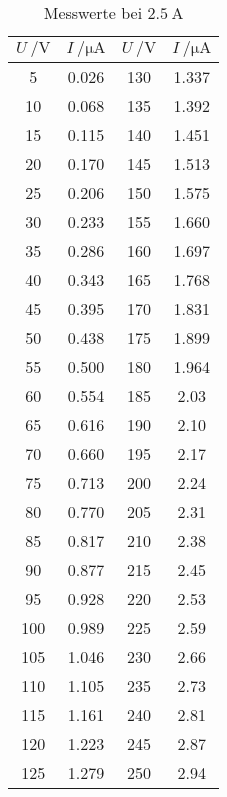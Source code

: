 \begin{table}[H]
  \centering
  \caption{Messwerte bei $ \SI{2.5}{\ampere}$}
  \label{tab:tabe2}
    \begin{tabular}{S S |S S}
    \toprule
    $ U \: / \si{\volt} $ & $ I \: / \si{\micro\ampere} $ & $ U \: / \si{\volt} $ & $ I \: / \si{\micro\ampere} $  \\
     & 0.026 & 130 & 1.337 \\
    10 & 0.068 & 135 & 1.392 \\
    15 & 0.115 & 140 & 1.451 \\
    20 & 0.170 & 145 & 1.513 \\
    25 & 0.206 & 150 & 1.575 \\
    30 & 0.233 & 155 & 1.660 \\
    35 & 0.286 & 160 & 1.697 \\
    40 & 0.343 & 165 & 1.768 \\
    45 & 0.395 & 170 & 1.831 \\
    50 & 0.438 & 175 & 1.899 \\
    55 & 0.500 & 180 & 1.964 \\
    60 & 0.554 & 185 & 2.03 \\
    65 & 0.616 & 190 & 2.10 \\
    70 & 0.660 & 195 & 2.17 \\
    75 & 0.713 & 200 & 2.24 \\
    80 & 0.770 & 205 & 2.31 \\
    85 & 0.817 & 210 & 2.38 \\
    90 & 0.877 & 215 & 2.45 \\
    95 & 0.928 & 220 & 2.53 \\
    100 & 0.989 & 225 & 2.59 \\
    105 & 1.046 & 230 & 2.66 \\
    110 & 1.105 & 235 & 2.73 \\
    115 & 1.161 & 240 & 2.81 \\
    120 & 1.223 & 245 & 2.87 \\
    125 & 1.279 & 250 & 2.94 \\



          \bottomrule
        \end{tabular}
    \end{table}
